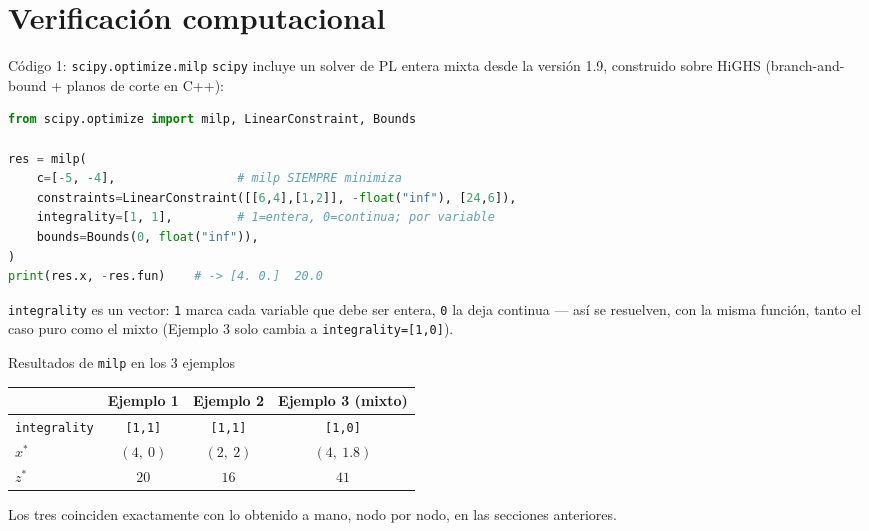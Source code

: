 \documentclass[aspectratio=169]{beamer}
\begin{document}
\section{Verificación computacional}

\begin{frame}[fragile]{Código 1: \texttt{scipy.optimize.milp}}
\texttt{scipy} incluye un solver de PL entera mixta desde la versión 1.9, construido sobre HiGHS (branch-and-bound + planos de corte en C++):

\begin{lstlisting}[language=Python]
from scipy.optimize import milp, LinearConstraint, Bounds

res = milp(
    c=[-5, -4],                 # milp SIEMPRE minimiza
    constraints=LinearConstraint([[6,4],[1,2]], -float("inf"), [24,6]),
    integrality=[1, 1],         # 1=entera, 0=continua; por variable
    bounds=Bounds(0, float("inf")),
)
print(res.x, -res.fun)    # -> [4. 0.]  20.0
\end{lstlisting}

\texttt{integrality} es un vector: \texttt{1} marca cada variable que debe ser entera, \texttt{0} la deja continua --- así se resuelven, con la misma función, tanto el caso puro como el mixto (Ejemplo 3 solo cambia a \texttt{integrality=[1,0]}).
\end{frame}

\begin{frame}{Resultados de \texttt{milp} en los 3 ejemplos}
\begin{center}
\renewcommand{\arraystretch}{1.4}
\begin{tabular}{@{}lccc@{}}
\toprule
& \textbf{Ejemplo 1} & \textbf{Ejemplo 2} & \textbf{Ejemplo 3 (mixto)}\\
\midrule
\texttt{integrality} & \texttt{[1,1]} & \texttt{[1,1]} & \texttt{[1,0]}\\
$x^\ast$ & $(4,\ 0)$ & $(2,\ 2)$ & $(4,\ 1.8)$\\
$z^\ast$ & $20$ & $16$ & $41$\\
\bottomrule
\end{tabular}
\end{center}

\vspace{0.3cm}
Los tres coinciden exactamente con lo obtenido a mano, nodo por nodo, en las secciones anteriores.
\end{frame}
\end{document}
